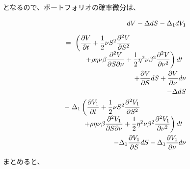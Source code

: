 \documentclass[uplatex,a4j,12pt,dvipdfmx]{jsarticle}
\begin{document}
となるので、ポートフォリオの確率微分は、


\begin{eqnarray*}
	&&
	dV - \Delta dS - \Delta_{1} dV_{1}
	\\[2mm]
	&&
	\hspace{-10mm}
	\begin{array}{l}
		= \
		\left(
		\dfrac{\partial V}{\partial t}
		+
		\dfrac{1}{2}
		\nu S^{2}
		\dfrac{\partial^{2} V}{\partial S^{2}}
		\right.
		\\ \hspace{10mm}
		\left.
		+
		\rho \eta \nu \beta
		\dfrac{\partial^{2} V}{\partial S \partial \nu}
		+
		\dfrac{1}{2}
		\eta^{2} \nu \beta^{2}
		\dfrac{\partial^{2} V}{\partial \nu^{2}}
		\right)dt
	\end{array}
	\\
	&&
	\hspace{-5mm}
	+
	\dfrac{\partial V}{\partial S}
	dS
	+
	\dfrac{\partial V}{\partial \nu}
	d\nu
	\\
	&&
	\hspace{-5mm}
	-
	\Delta dS
	\\
	&&
	\hspace{-6.6mm}
	\begin{array}{l}
		- \
		\Delta_{1}
		\left(
		\dfrac{\partial V_{1}}{\partial t}
		+
		\dfrac{1}{2}
		\nu S^{2}
		\dfrac{\partial^{2} V_{1}}{\partial S^{2}}
		\right.
		\\ \hspace{10mm}
		\left.
		+
		\rho \eta \nu \beta
		\dfrac{\partial^{2} V_{1}}{\partial S \partial \nu}
		+
		\dfrac{1}{2}
		\eta^{2} \nu \beta^{2}
		\dfrac{\partial^{2} V_{1}}{\partial \nu^{2}}
		\right)dt
	\end{array}
	\\
	&&
	\hspace{-5mm}
	-
	\Delta_{1}
	\dfrac{\partial V_{1}}{\partial S}
	dS
	-
	\Delta_{1}
	\dfrac{\partial V_{1}}{\partial \nu}
	d\nu
\end{eqnarray*}


まとめると、
\end{document}
